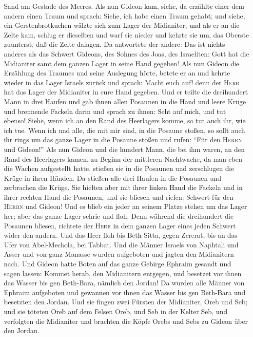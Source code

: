 Sand am Gestade des Meeres.  Als nun Gideon kam, siehe,
da erzählte einer dem andern einen Traum und sprach: Siehe, ich habe
einen Traum gehabt; und siehe, ein Gerstenbrotkuchen wälzte sich zum
Lager der Midianiter; und als er an die Zelte kam, schlug er dieselben
und warf sie nieder und kehrte sie um, das Oberste zuunterst, daß die
Zelte dalagen.  Da antwortete der andere: Das ist nichts
anderes als das Schwert Gideons, des Sohnes des Joas, des Israeliten:
Gott hat die Midianiter samt dem ganzen Lager in seine Hand gegeben!
 Als nun Gideon die Erzählung des Traumes und seine
Auslegung hörte, betete er an und kehrte wieder in das Lager Israels
zurück und sprach: Macht euch auf! denn der \textsc{Herr} hat das Lager
der Midianiter in eure Hand gegeben.  Und er teilte die
dreihundert Mann in drei Haufen und gab ihnen allen Posaunen in die Hand
und leere Krüge und brennende Fackeln darin  und sprach
zu ihnen: Seht auf mich, und tut ebenso! Siehe, wenn ich an den Rand des
Heerlagers komme, so tut auch ihr, wie ich tue.  Wenn ich
und alle, die mit mir sind, in die Posaune stoßen, so sollt auch ihr
rings um das ganze Lager in die Posaune stoßen und rufen: ``Für den
\textsc{Herrn} und Gideon!''  Als nun Gideon und die
hundert Mann, die bei ihm waren, an den Rand des Heerlagers kamen, zu
Beginn der mittleren Nachtwache, da man eben die Wachen aufgestellt
hatte, stießen sie in die Posaunen und zerschlugen die Krüge in ihren
Händen.  Da stießen alle drei Haufen in die Posaunen und
zerbrachen die Krüge. Sie hielten aber mit ihrer linken Hand die Fackeln
und in ihrer rechten Hand die Posaunen, und sie bliesen und riefen:
Schwert für den \textsc{Herrn} und Gideon!  Und es blieb
ein jeder an seinem Platze stehen um das Lager her; aber das ganze Lager
schrie und floh.  Denn während die dreihundert die
Posaunen bliesen, richtete der \textsc{Herr} in dem ganzen Lager eines
jeden Schwert wider den andern. Und das Heer floh bis Beth-Sitta, gegen
Zererat, bis an das Ufer von Abel-Mechola, bei Tabbat. 
Und die Männer Israels von Naphtali und Asser und von ganz Manasse
wurden aufgeboten und jagten den Midianitern nach.  Und
Gideon hatte Boten auf das ganze Gebirge Ephraim gesandt und sagen
lassen: Kommet herab, den Midianitern entgegen, und besetzet vor ihnen
das Wasser bis gen Beth-Bara, nämlich den Jordan! Da wurden alle Männer
von Ephraim aufgeboten und gewannen vor ihnen das Wasser bis gen
Beth-Bara und besetzten den Jordan.  Und sie fingen zwei
Fürsten der Midianiter, Oreb und Seb; und sie töteten Oreb auf dem
Felsen Oreb, und Seb in der Kelter Seb, und verfolgten die Midianiter
und brachten die Köpfe Orebs und Sebs zu Gideon über den Jordan.

